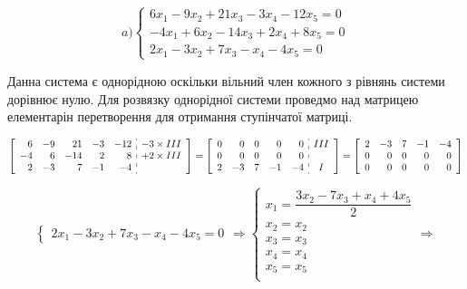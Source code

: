 {}

$$
a)  \begin{cases}
    6x_1-9x_2+21x_3-3x_4-12x_5=0 \\
    -4x_1+6x_2-14x_3+2x_4+8x_5=0 \\
    2x_1-3x_2+7x_3-x_4-4x_5=0
  \end{cases}
$$


Данна система є однорідною оскільки вільний член кожного з рівнянь системи дорівнює нулю.
Для розвязку однорідної системи проведмо над матрицею елементарін перетворення для отримання ступінчатої матриці.

$$
\left[ \begin{array}{rrrrr:c}
6 & -9 &  21 & -3 & -12 & -3 \times III \\
-4 & 6 & -14 &  2 &   8 & +2 \times III \\
2 & -3 &   7 &  -1 &   -4 & \\
\end{array} \right] = \left[ \begin{array}{rrrrr:c}
0 & 0 &   0& 0 & 0       & III \\
0 & 0 & 0 &  0 &   0     & \\
2 & -3 &   7 &  -1 & -4  & I \\
\end{array} \right] = \left[ \begin{array}{rrrrr}
2 & -3 &   7 &  -1 & -4   \\
0 & 0 & 0 &  0 &   0      \\
0 & 0 & 0 &  0 &   0      \\
\end{array} \right]
$$

$$
\begin{cases}
    2x_1-3x_2+7x_3-x_4-4x_5=0
  \end{cases} \Rightarrow \begin{cases}
  x_1 = \dfrac{3x_2-7x_3+x_4+4x_5}{2} \\
  x_2 = x_2 \\
  x_3 = x_3 \\
  x_4 = x_4 \\
  x_5 = x_5 \\
\end{cases} \Rightarrow
$$

